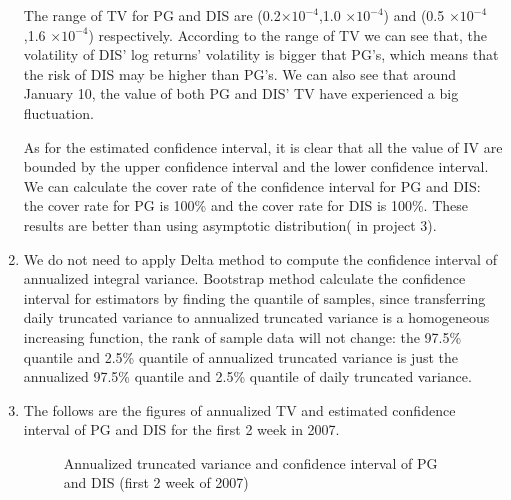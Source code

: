 \documentclass[12pt,letterpaper]{article}
\begin{document}
\begin{enumerate}[label=\textbf{(\Alph*)}]
The range of TV for PG and DIS are (0.2$\times10^{-4}$,1.0 $\times10^{-4}$) and (0.5 $\times10^{-4}$,1.6 $\times10^{-4}$) respectively. According to the range of TV we can see that, the volatility of DIS' log returns' volatility is bigger that PG's, which means that the risk of DIS may be higher than PG's.  We can also see that around January 10, the value of both PG and DIS' TV have experienced a big fluctuation.

As for the estimated confidence interval, it is clear that all the value of IV are bounded by the upper confidence interval and the lower confidence interval. We can calculate the cover rate of the confidence interval for PG and DIS: the cover rate for PG is 100\% and the cover rate for DIS is 100\%. These results are better than using asymptotic distribution( in project 3).

\item We do not need to apply Delta method to compute the confidence interval of annualized integral variance. Bootstrap method calculate the confidence interval for estimators by finding the quantile of samples, since transferring daily truncated variance to annualized truncated variance is a homogeneous increasing function, the rank of sample data will not change: the 97.5\% quantile and 2.5\% quantile of annualized truncated variance is just the annualized 97.5\% quantile and 2.5\% quantile of daily truncated variance.\\

\item The follows are the figures of annualized TV and estimated confidence interval of PG and DIS for the first 2 week in 2007.

 \begin{figure}[H]
            \centering
            \caption{Annualized truncated variance and confidence interval of PG and DIS (first 2 week of 2007)}
\end{figure}


\end{enumerate}
\end{document}
